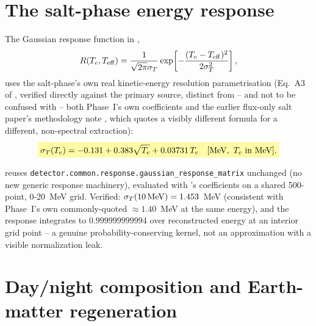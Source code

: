\section{The salt-phase energy response}
\label{sec:response-function}


\begin{theorybox}
The Gaussian response function in ,
\begin{equation}
  R(T_e,T_{\rm eff}) = \frac{1}{\sqrt{2\pi}\sigma_T}
    \exp\!\left[-\frac{(T_e-T_{\rm eff})^2}{2\sigma_T^2}\right],
  \label{eq:response-gaussian}
\end{equation}
uses the salt-phase's own real kinetic-energy resolution parametrisation
(Eq.~A3 of \cite{Aharmim2005SaltPhase}, verified directly against the
primary source, distinct from -- and not to be confused with -- both
Phase~I's own coefficients and the earlier flux-only salt paper's
methodology note \parencite{Ahmed2004SaltFlux}, which quotes a visibly
different formula for a different, non-spectral extraction):
\begin{equation}
  \keyresult{\sigma_T(T_e) = -0.131 + 0.383\sqrt{T_e} + 0.03731\,T_e \quad[{\rm MeV},\ T_e\text{ in MeV}].}
  \label{eq:response-sigma}
\end{equation}
\end{theorybox}

\begin{implbox}
 reuses
\texttt{detector.common.response.gaussian\_response\_matrix} unchanged
(no new generic response machinery), evaluated with
's coefficients on a shared 500-point, 0-20~MeV
grid. Verified: $\sigma_T(10\,{\rm MeV})=1.453$~MeV (consistent with
Phase~I's own commonly-quoted $\approx1.40$~MeV at the same energy), and
the response integrates to $0.999999999994$ over reconstructed energy at
an interior grid point -- a genuine probability-conserving kernel, not an
approximation with a visible normalization leak.
\end{implbox}

\section{Day/night composition and Earth-matter regeneration}
\label{sec:daynight-composition}


